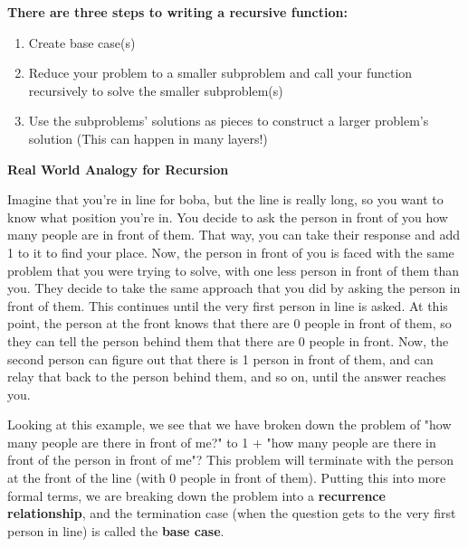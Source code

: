 \begin{blocksection}
\textbf{There are three steps to writing a recursive function:}
\begin{enumerate}
    \item Create base case(s)
    \item Reduce your problem to a smaller subproblem and call your function recursively to solve the smaller subproblem(s)
    \item Use the subproblems' solutions as pieces to construct a larger problem's solution (This can happen in many layers!)
\end{enumerate}

\vspace{3mm}

\textbf{Real World Analogy for Recursion}


Imagine that you're in line for boba, but the line is really long, so you want to know what position you're in. You decide to ask the person in front of you how many people are in front of them. That way, you can take their response and add 1 to it to find your place. Now, the person in front of you is faced with the same problem that you were trying to solve, with one less person in front of them than you. They decide to take the same approach that you did by asking the person in front of them. This continues until the very first person in line is asked. At this point, the person at the front knows that there are 0 people in front of them, so they can tell the person behind them that there are 0 people in front. Now, the second person can figure out that there is 1 person in front of them, and can relay that back to the person behind them, and so on, until the answer reaches you.

Looking at this example, we see that we have broken down the problem of "how many people are there in front of me?" to 1 + "how many people are there in front of the person in front of me"? This problem will terminate with the person at the front of the line (with 0 people in front of them). Putting this into more formal terms, we are breaking down the problem into a \textbf{recurrence relationship}, and the termination case (when the question gets to the very first person in line) is called the \textbf{base case}.
\end{blocksection}

